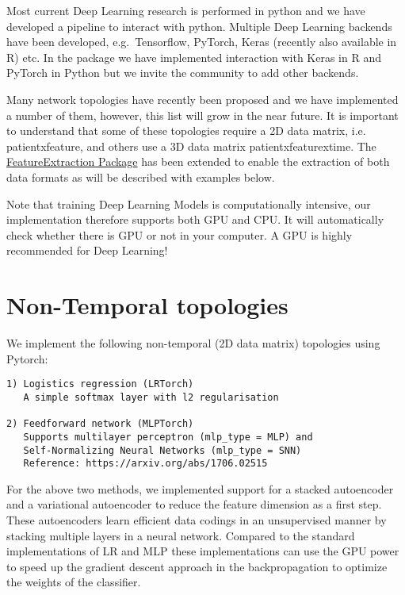 \documentclass[]{article}
\begin{document}
Most current Deep Learning research is performed in python and we have
developed a pipeline to interact with python. Multiple Deep Learning
backends have been developed, e.g.~Tensorflow, PyTorch, Keras (recently
also available in R) etc. In the package we have implemented interaction
with Keras in R and PyTorch in Python but we invite the community to add
other backends.

Many network topologies have recently been proposed and we have
implemented a number of them, however, this list will grow in the near
future. It is important to understand that some of these topologies
require a 2D data matrix, i.e.
\textbar{}patient\textbar{}x\textbar{}feature\textbar{}, and others use
a 3D data matrix
\textbar{}patient\textbar{}x\textbar{}feature\textbar{}x\textbar{}time\textbar{}.
The \href{www.github.com/ohdsi/FeatureExtraction}{FeatureExtraction
Package} has been extended to enable the extraction of both data formats
as will be described with examples below.

Note that training Deep Learning Models is computationally intensive,
our implementation therefore supports both GPU and CPU. It will
automatically check whether there is GPU or not in your computer. A GPU
is highly recommended for Deep Learning!

\section{Non-Temporal topologies}\label{non-temporal-topologies}

We implement the following non-temporal (2D data matrix) topologies
using Pytorch:

\begin{verbatim}
1) Logistics regression (LRTorch)
   A simple softmax layer with l2 regularisation

2) Feedforward network (MLPTorch) 
   Supports multilayer perceptron (mlp_type = MLP) and 
   Self-Normalizing Neural Networks (mlp_type = SNN)
   Reference: https://arxiv.org/abs/1706.02515
\end{verbatim}

For the above two methods, we implemented support for a stacked
autoencoder and a variational autoencoder to reduce the feature
dimension as a first step. These autoencoders learn efficient data
codings in an unsupervised manner by stacking multiple layers in a
neural network. Compared to the standard implementations of LR and MLP
these implementations can use the GPU power to speed up the gradient
descent approach in the backpropagation to optimize the weights of the
classifier.
\end{document}
